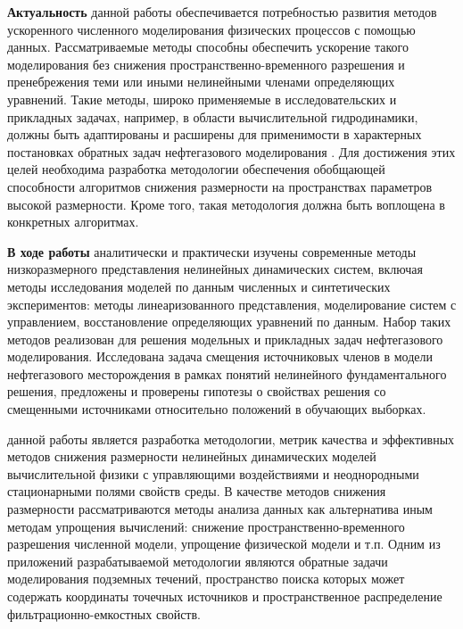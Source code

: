 
{\actuality}
\textbf{Актуальность} данной работы обеспечивается потребностью развития методов ускоренного численного моделирования физических процессов с помощью данных.
Рассматриваемые методы способны обеспечить ускорение такого моделирования без снижения пространственно-временного разрешения и пренебрежения теми или иными нелинейными членами определяющих уравнений.
Такие методы, широко применяемые в исследовательских и прикладных задачах, например, в области вычислительной гидродинамики, должны быть адаптированы и расширены для применимости в характерных постановках обратных задач нефтегазового моделирования .
Для достижения этих целей необходима разработка методологии обеспечения обобщающей способности алгоритмов снижения размерности на пространствах параметров высокой размерности.
Кроме того, такая методология должна быть воплощена в конкретных алгоритмах.

{\progress}
\textbf{В ходе работы} аналитически и практически изучены современные методы низкоразмерного представления нелинейных динамических систем, включая методы исследования моделей по данным численных и синтетических экспериментов: методы линеаризованного представления, моделирование систем с управлением, восстановление определяющих уравнений по данным. Набор таких методов реализован для решения модельных и прикладных задач нефтегазового моделирования. Исследована задача смещения источниковых членов в модели нефтегазового месторождения в рамках понятий нелинейного фундаментального решения, предложены и проверены гипотезы о свойствах решения со смещенными источниками относительно положений в обучающих выборках.

{\aim} данной работы является разработка методологии, метрик качества и эффективных методов снижения размерности нелинейных динамических моделей вычислительной физики с управляющими воздействиями и неоднородными стационарными полями свойств среды.
В качестве методов снижения размерности рассматриваются методы анализа данных как альтернатива иным методам упрощения вычислений: снижение пространственно-временного разрешения численной модели, упрощение физической модели и т.п.
Одним из приложений разрабатываемой методологии являются обратные задачи моделирования подземных течений, пространство поиска которых может содержать координаты точечных источников и пространственное распределение фильтрационно-емкостных свойств.

